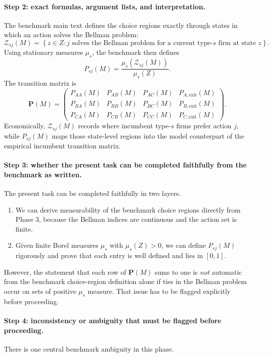 \paragraph{Step 2: exact formulas, argument lists, and interpretation.}
The benchmark main text defines the choice regions exactly through states in which an action solves the Bellman problem:
\[
\mathcal Z_{sj}(M)=\left\{z\in Z: j \text{ solves the Bellman problem for a current type-}s\text{ firm at state }z\right\}.
\]
Using stationary measures $\mu_s$, the benchmark then defines
\[
P_{sj}(M)=\frac{\mu_s(\mathcal Z_{sj}(M))}{\mu_s(Z)}.
\]
The transition matrix is
\[
\mathbf P(M)=
\begin{pmatrix}
P_{AA}(M) & P_{AB}(M) & P_{AC}(M) & P_{A,\mathrm{exit}}(M) \\
P_{BA}(M) & P_{BB}(M) & P_{BC}(M) & P_{B,\mathrm{exit}}(M) \\
P_{CA}(M) & P_{CB}(M) & P_{CC}(M) & P_{C,\mathrm{exit}}(M)
\end{pmatrix}.
\]
Economically, $\mathcal Z_{sj}(M)$ records where incumbent type-$s$ firms prefer action $j$, while $P_{sj}(M)$ maps those state-level regions into the model counterpart of the empirical incumbent transition matrix.

\paragraph{Step 3: whether the present task can be completed faithfully from the benchmark as written.}
The present task can be completed faithfully in two layers.
\begin{enumerate}
    \item We can derive measurability of the benchmark choice regions directly from Phase 3, because the Bellman indices are continuous and the action set is finite.
    \item Given finite Borel measures $\mu_s$ with $\mu_s(Z)>0$, we can define $P_{sj}(M)$ rigorously and prove that each entry is well defined and lies in $[0,1]$.
\end{enumerate}
However, the statement that each row of $\mathbf P(M)$ sums to one is \emph{not} automatic from the benchmark choice-region definition alone if ties in the Bellman problem occur on sets of positive $\mu_s$ measure. That issue has to be flagged explicitly before proceeding.

\paragraph{Step 4: inconsistency or ambiguity that must be flagged before proceeding.}
There is one central benchmark ambiguity in this phase.


